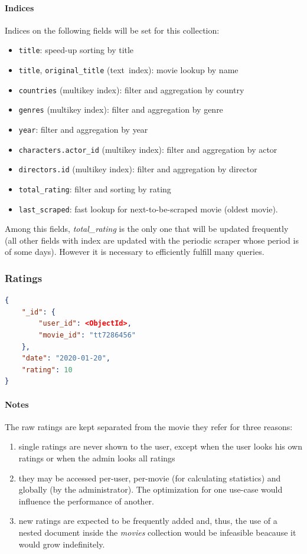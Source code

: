 \documentclass[11pt]{article}
\begin{document}
\paragraph{Indices} 
Indices on the following fields will be set for this collection:
\begin{itemize}
	\item \texttt{title}: speed-up sorting by title
	\item \texttt{title}, \texttt{original\_title} (text\ index): movie lookup 
			by name
	\item \texttt{countries} (multikey index): filter and aggregation by country
	\item \texttt{genres} (multikey index): filter and aggregation by genre
	\item \texttt{year}: filter and aggregation by year
	\item \texttt{characters.actor\_id} (multikey index): filter and aggregation by actor
	\item \texttt{directors.id} (multikey index): filter and aggregation by director
	\item \texttt{total\_rating}: filter and sorting by rating
	\item \texttt{last\_scraped}: fast lookup for next-to-be-scraped movie (oldest movie).
\end{itemize}

Among this fields, \emph{total\_rating} is the only one that will be updated 
frequently (all other fields with index are updated with the periodic scraper 
whose period is of some days). However it is necessary to efficiently fulfill 
many queries.

\subsubsection{Ratings}
\label{sec:ratings}

\begin{lstlisting}[language=json]	
{
	"_id": {
		"user_id": <ObjectId>,
		"movie_id": "tt7286456"
	},
	"date": "2020-01-20",
	"rating": 10
}
\end{lstlisting}

\paragraph{Notes}
The raw ratings are kept separated from the movie they refer for three reasons:
\begin{enumerate}
	\item single ratings are never shown to the user, except when the user 
			looks his own ratings or when the admin looks all ratings	
	\item they may be accessed per-user, per-movie (for calculating 	
			statistics) and globally (by the administrator). The optimization for one use-case would influence the performance of another.
	\item new ratings are expected to be frequently added and, thus, the use of 
		a nested document inside the \emph{movies} collection would be 
		infeasible beacause it would grow indefinitely. 
\end{enumerate} 
\end{document}

